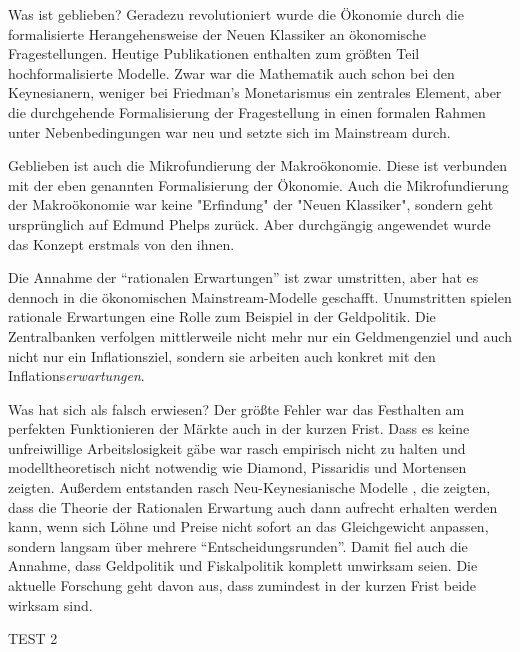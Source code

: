 Was ist geblieben? Geradezu revolutioniert wurde die Ökonomie durch die formalisierte Herangehensweise der Neuen Klassiker an ökonomische Fragestellungen. Heutige Publikationen enthalten zum größten Teil hochformalisierte Modelle. Zwar war die Mathematik auch schon bei den Keynesianern, weniger bei Friedman's Monetarismus ein zentrales Element, aber die durchgehende Formalisierung der Fragestellung in einen formalen Rahmen unter Nebenbedingungen war neu und setzte sich im Mainstream durch.

Geblieben ist auch die Mikrofundierung der Makroökonomie. Diese ist verbunden mit der eben genannten Formalisierung der Ökonomie. Auch die Mikrofundierung der Makroökonomie war keine "Erfindung" der "Neuen Klassiker", sondern geht ursprünglich auf Edmund Phelps zurück. Aber durchgängig angewendet wurde das Konzept erstmals von den ihnen.

Die Annahme der "`rationalen Erwartungen"' ist zwar umstritten, aber hat es dennoch in die ökonomischen Mainstream-Modelle geschafft. Unumstritten spielen rationale Erwartungen eine Rolle zum Beispiel in der Geldpolitik. Die Zentralbanken verfolgen mittlerweile nicht mehr nur ein Geldmengenziel und auch nicht nur ein Inflationsziel, sondern sie arbeiten auch konkret mit den Inflations\textit{erwartungen}.


Was hat sich als falsch erwiesen? Der größte Fehler war das Festhalten am perfekten Funktionieren der Märkte auch in der kurzen Frist. Dass es keine unfreiwillige Arbeitslosigkeit gäbe war rasch empirisch nicht zu halten und modelltheoretisch nicht notwendig wie Diamond, Pissaridis und Mortensen zeigten. Außerdem entstanden rasch Neu-Keynesianische Modelle , die zeigten, dass die Theorie der Rationalen Erwartung auch dann aufrecht erhalten werden kann, wenn sich Löhne und Preise nicht sofort an das Gleichgewicht anpassen, sondern langsam über mehrere "`Entscheidungsrunden"'. Damit fiel auch die Annahme, dass Geldpolitik und Fiskalpolitik komplett unwirksam seien. Die aktuelle Forschung geht davon aus, dass zumindest in der kurzen Frist beide wirksam sind.

TEST 2




